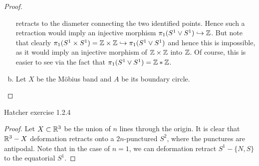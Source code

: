 \documentclass{../../mathnotes}
\begin{document}
\begin{proof}
\begin{enumerate}[(a)]
            retracts to the diameter connecting the two identified points. Hence such a retraction
            would imply an injective morphism $\pi_1(S^1\vee S^1)\hookrightarrow \mathbb{Z}$. But note
            that clearly $\pi_1(S^1\times S^1)=\mathbb{Z}\times\mathbb{Z}\hookrightarrow\pi_1(S^1\vee S^1)$
            and hence this is impossible, as it would imply an injective morphism of $\mathbb{Z}\times\mathbb{Z}$
            into $\mathbb{Z}$. Of course, this is easier to see via the fact that $\pi_1(S^1\vee S^1)=\mathbb{Z}*\mathbb{Z}$.
        \item Let $X$ be the M\"obius band and $A$ be its boundary circle.
    \end{enumerate}
\end{proof}

\begin{prop}
    Hatcher exercise 1.2.4
\end{prop}
\begin{proof}
    Let $X\subset\mathbb{R}^3$ be the union of $n$ lines through the origin. It is clear that $\mathbb{R}^3-X$
    deformation retracts onto a $2n$-punctured $S^2$, where the punctures are antipodal.
    Note that in the case of $n=1$, we can deformation retract $S^1-\{N,S\}$ to the equatorial
    $S^1$.
\end{proof}
\end{document}
